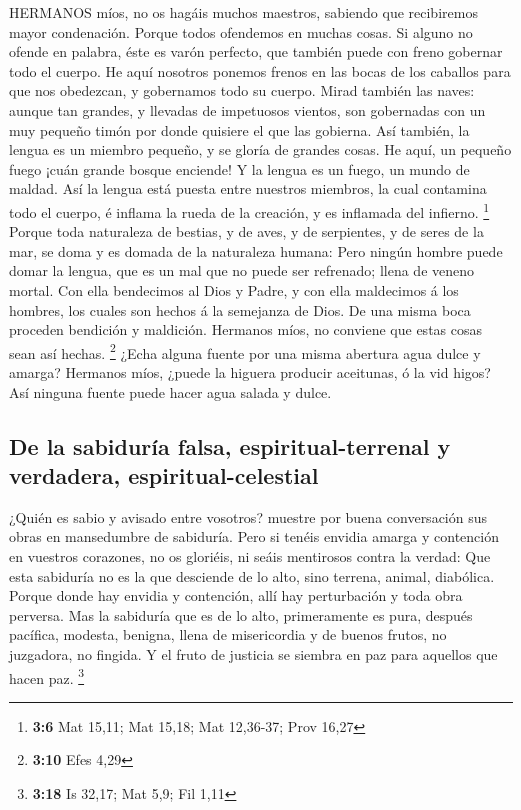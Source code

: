  HERMANOS míos, no os hagáis muchos maestros, sabiendo que
recibiremos mayor condenación.  Porque todos ofendemos en
muchas cosas. Si alguno no ofende en palabra, éste es varón perfecto,
que también puede con freno gobernar todo el cuerpo.  He
aquí nosotros ponemos frenos en las bocas de los caballos para que nos
obedezcan, y gobernamos todo su cuerpo.  Mirad también las
naves: aunque tan grandes, y llevadas de impetuosos vientos, son
gobernadas con un muy pequeño timón por donde quisiere el que las
gobierna.  Así también, la lengua es un miembro pequeño, y
se gloría de grandes cosas. He aquí, un pequeño fuego ¡cuán grande
bosque enciende!  Y la lengua es un fuego, un mundo de
maldad. Así la lengua está puesta entre nuestros miembros, la cual
contamina todo el cuerpo, é inflama la rueda de la creación, y es
inflamada del infierno. \footnote{\textbf{3:6} Mat 15,11; Mat 15,18; Mat
  12,36-37; Prov 16,27}  Porque toda naturaleza de bestias,
y de aves, y de serpientes, y de seres de la mar, se doma y es domada de
la naturaleza humana:  Pero ningún hombre puede domar la
lengua, que es un mal que no puede ser refrenado; llena de veneno
mortal.  Con ella bendecimos al Dios y Padre, y con ella
maldecimos á los hombres, los cuales son hechos á la semejanza de Dios.
 De una misma boca proceden bendición y maldición. Hermanos
míos, no conviene que estas cosas sean así hechas. \footnote{\textbf{3:10}
  Efes 4,29}  ¿Echa alguna fuente por una misma abertura
agua dulce y amarga?  Hermanos míos, ¿puede la higuera
producir aceitunas, ó la vid higos? Así ninguna fuente puede hacer agua
salada y dulce.

\hypertarget{de-la-sabiduruxeda-falsa-espiritual-terrenal-y-verdadera-espiritual-celestial}{%
\subsection{De la sabiduría falsa, espiritual-terrenal y verdadera,
espiritual-celestial}\label{de-la-sabiduruxeda-falsa-espiritual-terrenal-y-verdadera-espiritual-celestial}}

 ¿Quién es sabio y avisado entre vosotros? muestre por
buena conversación sus obras en mansedumbre de sabiduría. 
Pero si tenéis envidia amarga y contención en vuestros corazones, no os
gloriéis, ni seáis mentirosos contra la verdad:  Que esta
sabiduría no es la que desciende de lo alto, sino terrena, animal,
diabólica.  Porque donde hay envidia y contención, allí hay
perturbación y toda obra perversa.  Mas la sabiduría que es
de lo alto, primeramente es pura, después pacífica, modesta, benigna,
llena de misericordia y de buenos frutos, no juzgadora, no fingida.
 Y el fruto de justicia se siembra en paz para aquellos que
hacen paz. \footnote{\textbf{3:18} Is 32,17; Mat 5,9; Fil 1,11}

